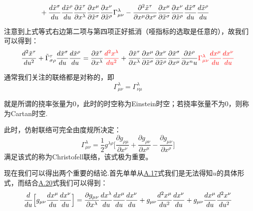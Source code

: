 \documentclass[a4paper]{book}
\begin{document}
\begin{appendix}
\begin{align}
	&+\frac{d\tilde{x}^{\sigma}}{du}\frac{d\tilde{x}^{\rho}}{du}\frac{\partial \tilde{x}^{\tau}}{\partial x^{\lambda}}\frac{\partial x^{\mu}}{\partial \tilde{x}^{\sigma}}\frac{\partial x^{\nu}}{\partial \tilde{x}^{\rho}}\Gamma^{\lambda}_{\mu \nu}-\frac{\partial^2 \tilde{x}^{\tau}}{\partial x^{\mu}\partial x^{\nu}}\frac{\partial x^{\mu}}{\partial \tilde{x}^{\sigma}}\frac{\partial x^{\nu}}{\partial \tilde{x}^{\rho}}\frac{d\tilde{x}^{\sigma}}{du}\frac{d\tilde{x}^{\rho}}{du} \notag
\end{align} \par 
注意到上式等式右边第二项与第四项正好抵消（哑指标的选取是任意的），故我们可以得到：
\begin{equation}
	\frac{d^2 \tilde{x}^{\tau}}{du^2}+\tilde{\Gamma}^{\tau}_{\sigma \rho}\frac{d\tilde{x}^{\sigma}}{du}\frac{d\tilde{x}^{\rho}}{du}=\frac{\partial \tilde{x}^{\tau}}{\partial x^{\lambda}}\textcolor{red}{\frac{d^2   x^{\lambda}}{du^2}}+\frac{\partial \tilde{x}^{\tau}}{\partial x^{\lambda}}\frac{\partial x^{\mu}}{\partial \tilde{x}^{\sigma}}\frac{\partial x^{\nu}}{\partial \tilde{x}^{\rho}}\frac{\partial \tilde{x}^{\sigma}}{\partial x^{\mu}}\frac{\partial \tilde{x}^{\rho}}{\partial x^nu}\textcolor{red}{\Gamma^{\lambda}_{\mu \nu}\frac{dx^{\mu}}{du}\frac{dx^{\nu}}{du}}
\end{equation}\par 
通常我们关注的联络都是对称的，即
\begin{equation}\label{A.19}
	\Gamma^{\lambda}_{\mu \nu}=\Gamma^{\lambda}_{\nu \mu}
\end{equation}\par 
就是所谓的挠率张量为0，此时的时空称为Einstein时空；若挠率张量不为0，则称为Cartan时空.\par 
此时，仿射联络可完全由度规所决定：
\begin{equation}\label{A.20}
		\Gamma^{\lambda}_{\mu \nu}=\frac{1}{2} g^{\lambda \rho}\Big[\frac{\partial g_{\rho \mu}}{\partial x^{\nu}}+\frac{\partial g_{\rho \nu}}{\partial x^{\mu}}-\frac{\partial g_{\mu \nu}}{\partial x^{\rho}}\Big]
\end{equation}
满足该式的称为Christofell联络，该式极为重要。\par 
现在我们可以得出两个重要的结论.首先单单从\hyperref[A.17]{A.17}式我们是无法得知$u$的具体形式，而结合\hyperref[A.20]{A.20}式我们可以得到：
\begin{align}
  \frac{d}{du}\Big[g_{\mu \nu}\frac{dx^{\mu}}{du}\frac{dx^{\nu}}{du}\Big]={} & \frac{\partial g_{\mu \nu}}{\partial x^{\lambda}}\frac{dx^{\lambda}}{du}\frac{dx^{\mu}}{du}\frac{dx^{\nu}}{du}+g_{\mu \nu}\frac{d^2x^{\mu}}{du^2}\frac{dx^{\nu}}{du}+g_{\mu \nu}\frac{dx^{\mu}}{du}\frac{d^2x^{\nu}}{du^2} \notag \\

\end{align}
\end{appendix}
\end{document}
